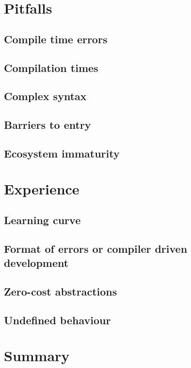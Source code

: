\documentclass[%
final,
xcolor = table,
usenames,
dvipsnames,
table,
aspectratio = 169]{beamer}
\begin{document}
\section{Pitfalls}

\subsection{Compile time errors}


\subsection{Compilation times}


\subsection{Complex syntax}


\subsection{Barriers to entry}


\subsection{Ecosystem immaturity}


\section{Experience}

\subsection{Learning curve}


\subsection{Format of errors or compiler driven development}


\subsection{Zero-cost abstractions}


\subsection{Undefined behaviour}



\section{Summary}



% 
\end{document}
